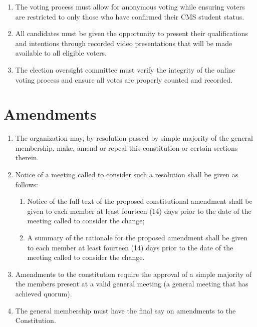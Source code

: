 \documentclass[12pt,a4paper]{article}
\begin{document}
\begin{enumerate}
\begin{enumerate}
\item The voting process must allow for anonymous voting while ensuring voters are restricted to only those who have confirmed their CMS student status.

\item All candidates must be given the opportunity to present their qualifications and intentions through recorded video presentations that will be made available to all eligible voters.

\item The election oversight committee must verify the integrity of the online voting process and ensure all votes are properly counted and recorded.
\end{enumerate}
\end{enumerate}

\section{Amendments}

\begin{enumerate}
\item The organization may, by resolution passed by simple majority of the general membership, make, amend or repeal this constitution or certain sections therein.

\item Notice of a meeting called to consider such a resolution shall be given as follows:

\begin{enumerate}
\item Notice of the full text of the proposed constitutional amendment shall be given to each member at least fourteen (14) days prior to the date of the meeting called to consider the change;

\item A summary of the rationale for the proposed amendment shall be given to each member at least fourteen (14) days prior to the date of the meeting called to consider the change.
\end{enumerate}

\item Amendments to the constitution require the approval of a simple majority of the members present at a valid general meeting (a general meeting that has achieved quorum).

\item The general membership must have the final say on amendments to the Constitution.
\end{enumerate}
\end{document}
